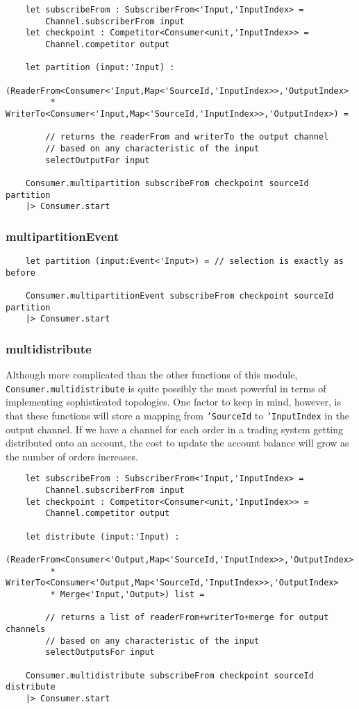 \documentclass{article}
\begin{document}
\begin{verbatim}
    let subscribeFrom : SubscriberFrom<'Input,'InputIndex> =
        Channel.subscriberFrom input
    let checkpoint : Competitor<Consumer<unit,'InputIndex>> =
        Channel.competitor output
    
    let partition (input:'Input) :
        (ReaderFrom<Consumer<'Input,Map<'SourceId,'InputIndex>>,'OutputIndex>
         * WriterTo<Consumer<'Input,Map<'SourceId,'InputIndex>>,'OutputIndex>) =
        
        // returns the readerFrom and writerTo the output channel
        // based on any characteristic of the input
        selectOutputFor input
        
    Consumer.multipartition subscribeFrom checkpoint sourceId partition
    |> Consumer.start
\end{verbatim}

\subsubsection{multipartitionEvent}

\begin{verbatim}
    let partition (input:Event<'Input>) = // selection is exactly as before
    
    Consumer.multipartitionEvent subscribeFrom checkpoint sourceId partition
    |> Consumer.start
\end{verbatim}

\subsubsection{multidistribute}

Although more complicated than the other functions of this module, \texttt{Consumer.multidistribute} is quite possibly the most powerful in terms of implementing sophisticated topologies.  One factor to keep in mind, however, is that these functions will store a mapping from \texttt{'SourceId} to \texttt{'InputIndex} in the output channel. If we have a channel for each order in a trading system getting distributed onto an account, the cost to update the account balance will grow as the number of orders increases.

\begin{verbatim}
    let subscribeFrom : SubscriberFrom<'Input,'InputIndex> =
        Channel.subscriberFrom input
    let checkpoint : Competitor<Consumer<unit,'InputIndex>> =
        Channel.competitor output
    
    let distribute (input:'Input) :
        (ReaderFrom<Consumer<'Output,Map<'SourceId,'InputIndex>>,'OutputIndex>
         * WriterTo<Consumer<'Output,Map<'SourceId,'InputIndex>>,'OutputIndex>
         * Merge<'Input,'Output>) list =
        
        // returns a list of readerFrom+writerTo+merge for output channels
        // based on any characteristic of the input
        selectOutputsFor input
        
    Consumer.multidistribute subscribeFrom checkpoint sourceId distribute
    |> Consumer.start
\end{verbatim}
\end{document}
